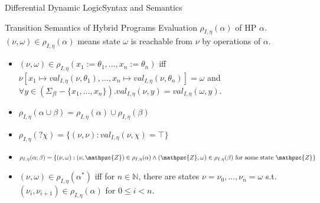 \documentclass{beamer}
\newcommand{\val}[4]{\textit{val}_{#1, #2}(#3, #4)}
\newcommand{\valDefault}[1]{\val{I}{\eta}{\nu}{#1}}
\newcommand{\transRel}[3]{\rho_{#1, #2}(#3)}
\newcommand{\transRelDef}[1]{\transRel{I}{\eta}{#1}}
\begin{document}
\begin{frame}{Differential Dynamic Logic}{Syntax and Semantics}
  \begin{block}{Transition Semantics of Hybrid Programs}
    Evaluation $\transRelDef{\alpha}$ of HP $\alpha$. $(\nu, \omega) \in
    \transRelDef{\alpha}$ means state $\omega$ is reachable from $\nu$ by
    operations of $\alpha$.
    \begin{itemize}
      \item $(\nu, \omega) \in \transRelDef{x_1 := \theta_1, \dots, x_n := \theta_n}$
        iff $\nu[x_1 \mapsto \valDefault{\theta_1}, \ldots, x_n \mapsto
        \valDefault{\theta_n}]
       = \omega$ and $\forall y \in (\Sigma_{\textit{fl}} - \{x_1, \ldots,
       x_n\}). \val{I}{\eta}{\nu}{y} = \val{I}{\eta}{\omega}{y}$.
       \pause
     \item $\transRelDef{\alpha \cup \beta} = \transRelDef{\alpha} \cup
       \transRelDef{\beta}$
       \pause
     \item $\transRelDef{?\chi} = \{(\nu,\nu) : \valDefault{\chi} = \top \}$
       \pause
     \item $\transRelDef{\alpha ; \beta} = \{(\nu,\omega) : (\nu, \mathpzc{Z}) \in
         \transRelDef{\alpha} \wedge (\mathpzc{Z},\omega) \in \transRelDef{\beta}
       \text{ for some state } \mathpzc{Z}\}$
       \pause
     \item $ (\nu, \omega) \in \transRelDef{\alpha^*}$ iff for $n \in
       \mathbb{N}$, there are states $\nu = \nu_0,\ldots,\nu_n = \omega$ s.t.
       $(\nu_i, \nu_{i+1}) \in \transRelDef{\alpha}$ for $0 \leq i < n$.
    \end{itemize}
  \end{block}
\end{frame}
\end{document}
